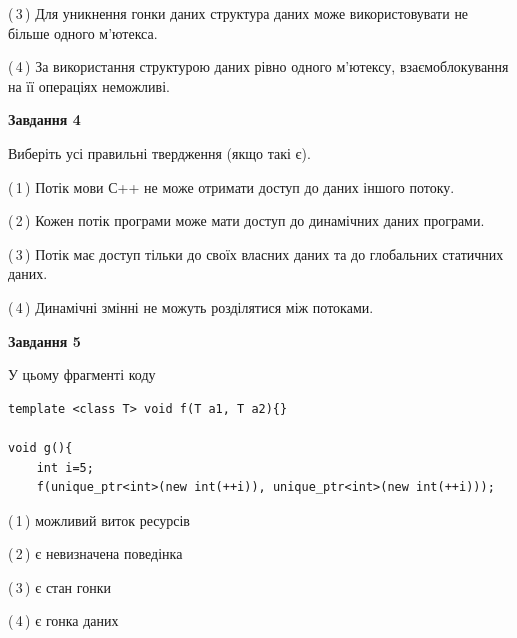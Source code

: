 \documentclass[12pt, ukrainian]{article}
\begin{document}
\begin {large}
{(\,3\,) Для уникнення гонки даних структура даних може використовувати не більше одного м’ютекса.%

(\,4\,) За використання структурою даних рівно одного м’ютексу, взаємоблокування на її операціях неможливі.%



\begin{center}
\textbf{Завдання 4}
\end{center}
Виберіть усі правильні твердження (якщо такі є).\par
\vspace{2mm}

(\,1\,) Потік мови С++ не може отримати доступ до даних іншого потоку.%

(\,2\,) Кожен потік програми може мати доступ до динамічних даних програми.%

(\,3\,) Потік має доступ тільки до своїх власних даних та до глобальних статичних даних.%

(\,4\,) Динамічні змінні не можуть розділятися між потоками.%



\begin{center}
\textbf{Завдання 5}
\end{center}
У цьому фрагменті коду
\begin{verbatim}
template <class T> void f(T a1, T a2){}

void g(){
    int i=5;
    f(unique_ptr<int>(new int(++i)), unique_ptr<int>(new int(++i)));
\end{verbatim}

(\,1\,) можливий виток ресурсів%

(\,2\,) є невизначена поведінка%

(\,3\,) є стан гонки%

(\,4\,) є гонка даних%


}
\end {large}
\end{document}
